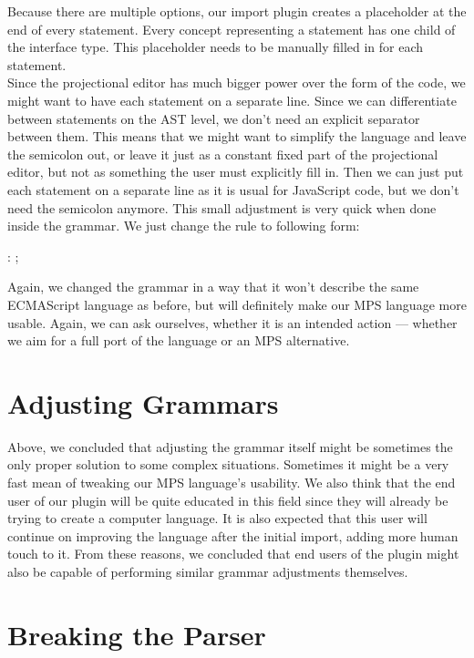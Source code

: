 Because there are multiple options, our import plugin creates a placeholder at the end of every statement.
Every concept representing a statement has one child of the  interface type.
This placeholder needs to be manually filled in for each statement.
\\

Since the projectional editor has much bigger power over the form of the code, we might want to have each statement on a separate line.
Since we can differentiate between statements on the AST level, we don't need an explicit separator between them.
This means that we might want to simplify the language and leave the semicolon out, or leave it just as a constant fixed part of the projectional editor, but not as something the user must explicitly fill in.
Then we can just put each statement on a separate line as it is usual for JavaScript code, but we don't need the semicolon anymore.
This small adjustment is very quick when done inside the grammar.
We just change the  rule to following form:

\begin{antlr}
	 : \literal{;} ;
\end{antlr}

Again, we changed the grammar in a way that it won't describe the same ECMAScript language as before, but will definitely make our MPS language more usable.
Again, we can ask ourselves, whether it is an intended action --- whether we aim for a full port of the language or an MPS alternative.

\section{Adjusting Grammars}
Above, we concluded that adjusting the grammar itself might be sometimes the only proper solution to some complex situations.
Sometimes it might be a very fast mean of tweaking our MPS language's usability.
We also think that the end user of our plugin will be quite educated in this field since they will already be trying to create a computer language.
It is also expected that this user will continue on improving the language after the initial import, adding more human touch to it.
From these reasons, we concluded that end users of the plugin might also be capable of performing similar grammar adjustments themselves.

\section{Breaking the Parser}
\label{chap:breaking_the_parser}

